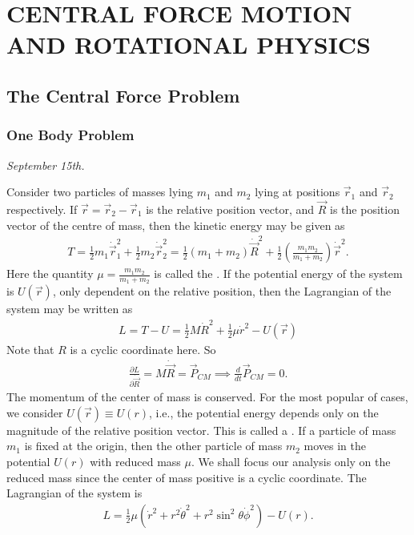 \chapter{CENTRAL FORCE MOTION AND ROTATIONAL PHYSICS}

\section{The Central Force Problem}
\subsection{One Body Problem}
\textit{September 15th.}

Consider two particles of masses lying $m_{1}$ and $m_{2}$ lying at positions $\vec{r}_{1}$ and $\vec{r}_{2}$ respectively. If $\vec{r} = \vec{r}_{2}-\vec{r}_{1}$ is the relative position vector, and $\vec{R}$ is the position vector of the centre of mass, then the kinetic energy may be given as
\begin{align}
    T = \frac{1}{2}m_{1}\dot{\vec{r}}_{1}^{2} + \frac{1}{2}m_{2}\dot{\vec{r}}_{2}^{2} = \frac{1}{2}(m_{1}+m_{2})\dot{\vec{R}}^{2} + \frac{1}{2}\left( \frac{m_{1}m_{2}}{m_{1}+m_{2}} \right) \dot{\vec{r}}^{2}.
\end{align}
Here the quantity $\mu = \frac{m_{1}m_{2}}{m_{1}+m_{2}}$ is called the . If the potential energy of the system is $U(\vec{r})$, only dependent on the relative position, then the Lagrangian of the system may be written as
\begin{align}
    L = T-U = \frac{1}{2}M\dot{R}^{2} + \frac{1}{2}\mu \dot{r}^{2} - U(\vec{r})
\end{align}
Note that $R$ is a cyclic coordinate here. So
\begin{align}
    \frac{\partial L}{\partial \dot{\vec{R}}} = M\dot{\vec{R}} = \vec{P}_{CM} \implies \frac{d}{dt} \vec{P}_{CM} = 0.
\end{align}
The momentum of the center of mass is conserved. For the most popular of cases, we consider $U(\vec{r}) \equiv U(r)$, i.e., the potential energy depends only on the magnitude of the relative position vector. This is called a . If a particle of mass $m_{1}$ is fixed at the origin, then the other particle of mass $m_{2}$ moves in the potential $U(r)$ with reduced mass $\mu$. We shall focus our analysis only on the reduced mass since the center of mass positive is a cyclic coordinate. The Lagrangian of the system is
\begin{align}
    L = \frac{1}{2}\mu(\dot{r}^{2} + r^{2}\dot{\theta}^{2} + r^{2}\sin^{2}\theta \dot{\phi}^{2}) - U(r).
\end{align}
